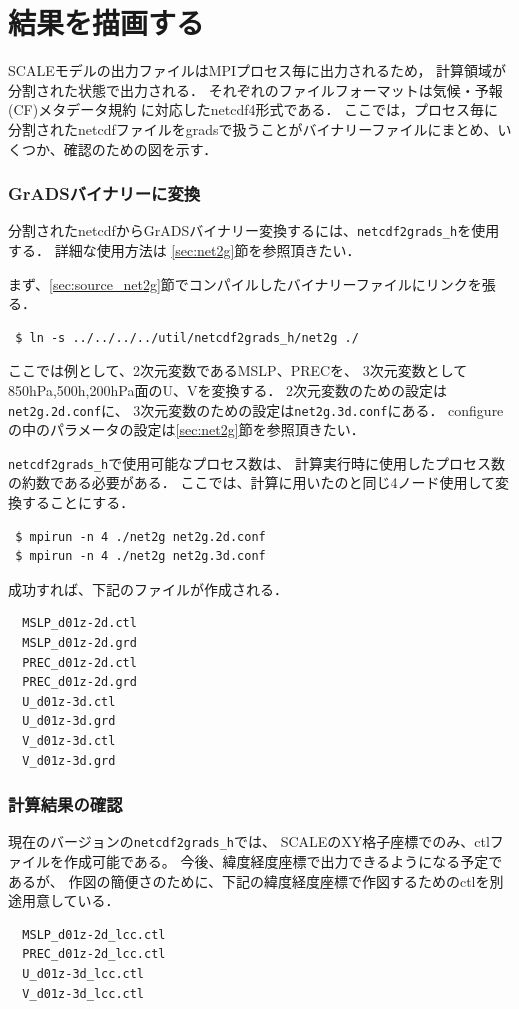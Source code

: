 \section{結果を描画する}
\label{sec:quicklook}

SCALEモデルの出力ファイルはMPIプロセス毎に出力されるため，
計算領域が分割された状態で出力される．
それぞれのファイルフォーマットは気候・予報(CF)メタデータ規約
に対応したnetcdf4形式である．
ここでは，プロセス毎に分割されたnetcdfファイルをgradsで扱うことがバイナリーファイルにまとめ、いくつか、確認のための図を示す．

\subsubsection{GrADSバイナリーに変換}
分割されたnetcdfからGrADSバイナリー変換するには、\verb|netcdf2grads_h|を使用する．
詳細な使用方法は \ref{sec:net2g}節を参照頂きたい．

まず、\ref{sec:source_net2g}節でコンパイルしたバイナリーファイルにリンクを張る．
\begin{verbatim}
 $ ln -s ../../../../util/netcdf2grads_h/net2g ./
\end{verbatim}
ここでは例として、2次元変数であるMSLP、PRECを、
3次元変数として850hPa,500h,200hPa面のU、Vを変換する．
2次元変数のための設定は\verb|net2g.2d.conf|に、
3次元変数のための設定は\verb|net2g.3d.conf|にある．
configureの中のパラメータの設定は\ref{sec:net2g}節を参照頂きたい．

\verb|netcdf2grads_h|で使用可能なプロセス数は、
計算実行時に使用したプロセス数の約数である必要がある．
ここでは、計算に用いたのと同じ4ノード使用して変換することにする．
\begin{verbatim}
 $ mpirun -n 4 ./net2g net2g.2d.conf
 $ mpirun -n 4 ./net2g net2g.3d.conf
\end{verbatim}
成功すれば、下記のファイルが作成される．
\begin{verbatim}
  MSLP_d01z-2d.ctl
  MSLP_d01z-2d.grd
  PREC_d01z-2d.ctl
  PREC_d01z-2d.grd
  U_d01z-3d.ctl
  U_d01z-3d.grd
  V_d01z-3d.ctl
  V_d01z-3d.grd
\end{verbatim}


\subsubsection{計算結果の確認}
現在のバージョンの\verb|netcdf2grads_h|では、
SCALEのXY格子座標でのみ、ctlファイルを作成可能である。
今後、緯度経度座標で出力できるようになる予定であるが、
作図の簡便さのために、下記の緯度経度座標で作図するためのctlを別途用意している．
\begin{verbatim}
  MSLP_d01z-2d_lcc.ctl
  PREC_d01z-2d_lcc.ctl
  U_d01z-3d_lcc.ctl
  V_d01z-3d_lcc.ctl
\end{verbatim}

